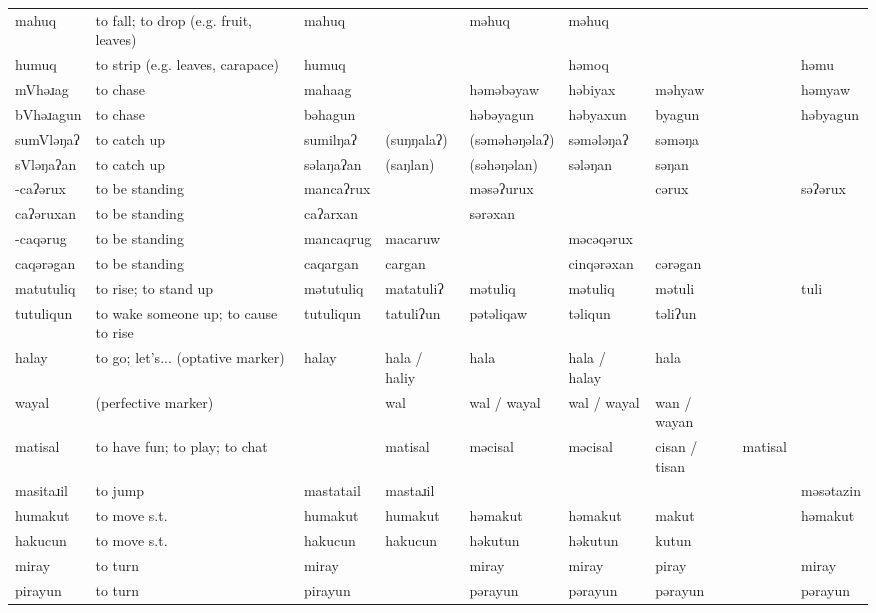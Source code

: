 \begin{landscape}
\begin{longtable}{*{9}{p{}}}
\text{*}mahuq & to fall; to drop (e.g. fruit, leaves) & mahuq &  & məhuq & məhuq &  &  & \\
\text{*}humuq & to strip (e.g. leaves, carapace) & humuq &  &  & həmoq &  &  & həmu\\
\text{*}mVhəɹag & to chase & mahaag &  & həməbəyaw & həbiyax & məhyaw &  & həmyaw\\
\text{*}bVhəɹagun & to chase & bəhagun &  & həbəyagun & həbyaxun & byagun &  & həbyagun\\
\text{*}sumVləŋaʔ & to catch up & sumilŋaʔ & (suŋŋalaʔ) & (səməhəŋəlaʔ) & səmələŋaʔ & səməŋa &  & \\
\text{*}sVləŋaʔan & to catch up & səlaŋaʔan & (saŋlan) & (səhəŋəlan) & sələŋan & səŋan &  & \\
\text{*}-caʔərux & to be standing & mancaʔrux &  & məsəʔurux &  & cərux &  & səʔərux\\
\text{*}caʔəruxan & to be standing & caʔarxan &  & sərəxan &  &  &  & \\
\text{*}-caqərug & to be standing & mancaqrug & macaruw &  & məcəqərux &  &  & \\
\text{*}caqərəgan & to be standing & caqargan & cargan &  & cinqərəxan & cərəgan &  & \\
\text{*}matutuliq & to rise; to stand up & mətutuliq & matatuliʔ & mətuliq & mətuliq & mətuli &  & tuli\\
\text{*}tutuliqun & to wake someone up; to cause to rise & tutuliqun & tatuliʔun & pətəliqaw & təliqun & təliʔun &  & \\
\text{*}halay & to go; let's... (optative marker) & halay & hala / haliy & hala & hala / halay & hala &  & \\
\text{*}wayal & (perfective marker) &  & wal & wal / wayal & wal / wayal & wan / wayan &  & \\
\text{*}matisal & to have fun; to play; to chat &  & matisal & məcisal & məcisal & cisan / tisan & matisal & \\
\text{*}masitaɹil & to jump & mastatail & mastaɹil &  &  &  &  & məsətazin\\
\text{*}humakut & to move s.t. & humakut & humakut & həmakut & həmakut & makut &  & həmakut\\
\text{*}hakucun & to move s.t. & hakucun & hakucun & həkutun & həkutun & kutun &  & \\
\text{*}miray & to turn & miray &  & miray & miray & piray &  & miray\\
\text{*}pirayun & to turn & pirayun &  & pərayun & pərayun & pərayun &  & pərayun\\

\end{longtable}
\end{landscape}
